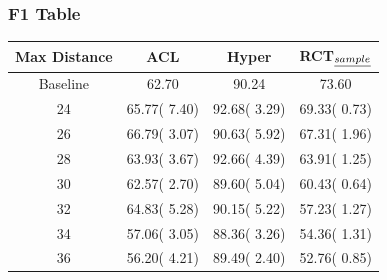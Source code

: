 \documentclass[11pt]{article}
\begin{document}







\subsubsection{F1 Table}
\label{sec:org47718b9}
\begin{center}
\begin{tabular}{|c|c|c|c|}
\hline
Max Distance & ACL & Hyper & RCT\(_{\emph{sample}}\)\\
\hline
Baseline & 62.70 & 90.24 & 73.60\\
\hline
24 & 65.77(\textpm{} 7.40) & 92.68(\textpm{} 3.29) & 69.33(\textpm{} 0.73)\\
\hline
26 & 66.79(\textpm{} 3.07) & 90.63(\textpm{} 5.92) & 67.31(\textpm{} 1.96)\\
\hline
28 & 63.93(\textpm{} 3.67) & 92.66(\textpm{} 4.39) & 63.91(\textpm{} 1.25)\\
\hline
30 & 62.57(\textpm{} 2.70) & 89.60(\textpm{} 5.04) & 60.43(\textpm{} 0.64)\\
\hline
32 & 64.83(\textpm{} 5.28) & 90.15(\textpm{} 5.22) & 57.23(\textpm{} 1.27)\\
\hline
34 & 57.06(\textpm{} 3.05) & 88.36(\textpm{} 3.26) & 54.36(\textpm{} 1.31)\\
\hline
36 & 56.20(\textpm{} 4.21) & 89.49(\textpm{} 2.40) & 52.76(\textpm{} 0.85)\\
\hline
\end{tabular}
\end{center}
\end{document}
